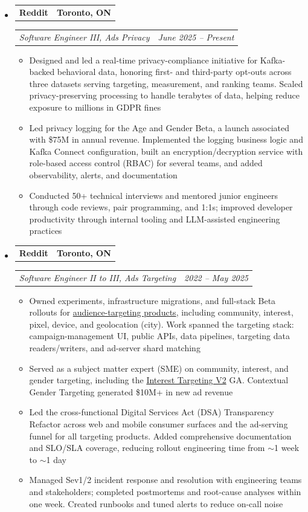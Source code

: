 \documentclass[10pt,letterpaper]{article}
\makeatletter
\newcommand{\headerrow}[2]
	{\begin{tabular*}{\linewidth}{l@{\extracolsep{\fill}}r}
			#1 &
			#2 \\
	\end{tabular*}}
\makeatother
\begin{document}
		\begin{itemize}[label={}, leftmargin=*]

			\item
			\headerrow
			{\textbf{Reddit}}
			{\textbf{Toronto, ON}}
			\headerrow
			{\emph{Software Engineer III, Ads Privacy}}
			{\emph{June 2025 -- Present}}
			\begin{itemize}
				\setlength\itemsep{0.1em}
				\item Designed and led a real-time privacy-compliance initiative for Kafka-backed behavioral data, honoring first- and third-party opt-outs across three datasets serving targeting, measurement, and ranking teams. Scaled privacy-preserving processing to handle terabytes of data, helping reduce exposure to millions in GDPR fines
				\item Led privacy logging for the Age and Gender Beta, a launch associated with \$75M in annual revenue. Implemented the logging business logic and Kafka Connect configuration, built an encryption/decryption service with role-based access control (RBAC) for several teams, and added observability, alerts, and documentation
				\item Conducted 50+ technical interviews and mentored junior engineers through code reviews, pair programming, and 1:1s; improved developer productivity through internal tooling and LLM-assisted engineering practices
			\end{itemize}

			\item
			\headerrow
			{\textbf{Reddit}}
			{\textbf{Toronto, ON}}
			\headerrow
			{\emph{Software Engineer II to III, Ads Targeting}}
			{\emph{2022 -- May 2025}}
			\begin{itemize}
				\setlength\itemsep{0.1em}
				\item Owned experiments, infrastructure migrations, and full-stack Beta rollouts for \href{https://business.reddithelp.com/s/article/Overview-Reddit-Ads-Audience-and-Targeting}{audience-targeting products}, including community, interest, pixel, device, and geolocation (city). Work spanned the targeting stack: campaign-management UI, public APIs, data pipelines, targeting data readers/writers, and ad-server shard matching
				\item Served as a subject matter expert (SME) on community, interest, and gender targeting, including the \href{https://www.socialmediatoday.com/news/reddit-expands-interest-targeting-for-ads/691572/}{Interest Targeting V2} GA. Contextual Gender Targeting generated \$10M+ in new ad revenue
				\item Led the cross-functional Digital Services Act (DSA) Transparency Refactor across web and mobile consumer surfaces and the ad-serving funnel for all targeting products. Added comprehensive documentation and SLO/SLA coverage, reducing rollout engineering time from $\sim$1 week to $\sim$1 day
				\item Managed Sev1/2 incident response and resolution with engineering teams and stakeholders; completed postmortems and root-cause analyses within one week. Created runbooks and tuned alerts to reduce on-call noise


\end{itemize}
\end{itemize}
\end{document}
